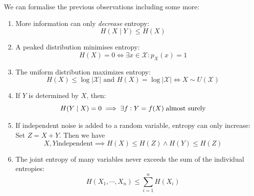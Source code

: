 \newpage
\begin{theorem} \label{theorem:more-entropy-observations}
    We can formalise the previous observations including some more:
    \begin{enumerate}
        \item More information can only \textit{decrease} entropy:
            \[
                H(X \mid Y) \le H(X)
            \]
        \item A peaked distribution minimises entropy:
            \[
                H(X) = 0 \iff \exists x \in \mathcal{X}: p_X(x) = 1
            \]
        \item The uniform distribution maximizes entropy:
            \[
                H(X) \le \log |\mathcal{X}| \text{ and } H(X) = \log |\mathcal{X}| \iff X \sim U(\mathcal{X})
            \]
        \item If $Y$ is determined by $X$, then:
            \[
                H(Y \mid X) = 0 \implies \exists f\vcentcolon Y = f(X) \; \text{almost surely}
            \]
        \item If independent noise is added to a random variable, entropy can only increase:
            Set $Z = X + Y$. Then we have
            \[
                X, Y \text{independent} \implies H(X) \le H(Z) \land H(Y) \le H(Z)
            \]
        \item The joint entropy of many variables never exceeds the sum of the individual entropies:
            \[
                H(X_1, \cdots, X_n) \le \sum_{i=1}^{n}{H(X_i)}
            \]
    \end{enumerate}
\end{theorem}
